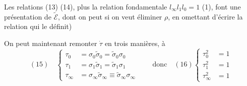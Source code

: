 Les relations (13) (14), plus la relation fondamentale $l_\infty l_1l_0=1$ (1), font une présentation de $\tilde{\mathcal E}$, dont on peut si on veut éliminer $\rho$, \unsure{(}en omettant d'écrire la relation qui le définit)

On peut maintenant remonter $\dot\tau$ en trois manières, à 
\[
(15)\quad\left\{\begin{aligned}
\tau_0&=\sigma_0\tilde\sigma_0=\tilde\sigma_0\sigma_0\\
\tau_1&=\sigma_1\tilde\sigma_1=\tilde\sigma_1\sigma_1\\
\tau_\infty&=\sigma_\infty\tilde\sigma_\infty\equiv\tilde\sigma_\infty\sigma_\infty
\end{aligned}\right.
\qquad\text{donc}\quad(16)\left\{\begin{aligned}
\tau_0^2&=1\\\tau_1^2&=1\\\tau_\infty^2&=1
\end{aligned}\right.
\]
